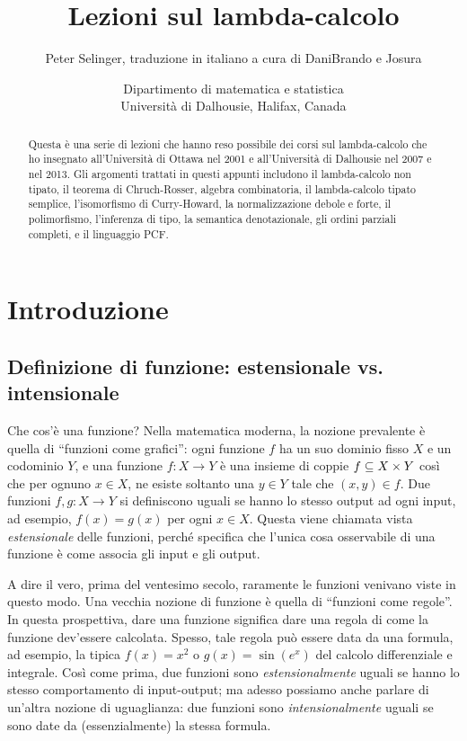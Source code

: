 \documentclass{article}
\title{Lezioni sul lambda-calcolo}
\author{Peter Selinger, traduzione in italiano a cura di DaniBrando e Josura}
\date{Dipartimento di matematica e statistica\\
  Universit\`a di Dalhousie, Halifax, Canada}
\begin{document}
\maketitle

\begin{abstract}
Questa \`e una serie di lezioni che hanno reso possibile dei corsi sul 
lambda-calcolo che ho insegnato all'Universit\`a di Ottawa nel 2001 e 
all'Universit\`a di Dalhousie nel 2007 e nel 2013. Gli argomenti trattati 
in questi appunti includono il lambda-calcolo non tipato, il teorema 
di Chruch-Rosser, algebra combinatoria, il lambda-calcolo tipato semplice, 
l'isomorfismo di Curry-Howard, la normalizzazione debole 
e forte, il polimorfismo, l'inferenza di tipo, la semantica denotazionale, 
gli ordini parziali completi, e il linguaggio PCF.
\end{abstract}

\tableofcontents

\newpage

\section{Introduzione}\label{sec-intro}

\subsection{Definizione di funzione: estensionale vs. intensionale}
\label{subsec-intro1}

Che cos'\`e una funzione? Nella matematica moderna, la nozione prevalente
\`e quella di ``funzioni come grafici'': ogni funzione $f$ ha un suo dominio
fisso $X$ e un codominio $Y$, e una funzione $f:X\to Y$ \`e una insieme di coppie
$f\subseteq X\times Y$ cos\`i che per ognuno $x\in X$, ne esiste soltanto
una $y\in Y$ tale che $(x,y)\in f$. Due funzioni $f,g:X\to Y$ si
definiscono uguali se hanno lo stesso output ad ogni input, ad esempio,
$f(x)=g(x)$ per ogni $x\in X$. Questa viene chiamata vista {\em estensionale}
delle funzioni, perch\'e specifica che l'unica cosa osservabile 
di una funzione \`e come associa gli input e gli output.

A dire il vero, prima del ventesimo secolo, raramente le funzioni venivano
viste in questo modo. Una vecchia nozione di funzione \`e quella di ``funzioni come 
regole''. In questa prospettiva, dare una funzione significa dare una regola di
come la funzione dev'essere calcolata. Spesso, tale regola pu\`o essere data da
una formula, ad esempio, la tipica $f(x)=x^2$ o $g(x)=\sin(e^x)$
del calcolo differenziale e integrale. Cos\`i come prima, due funzioni
sono {\em estensionalmente} uguali se hanno lo stesso comportamento di input-output;
ma adesso possiamo anche parlare di un'altra nozione di uguaglianza: due funzioni sono
{\em intensionalmente} uguali se sono date da (essenzialmente) la
stessa formula.
\end{document}
